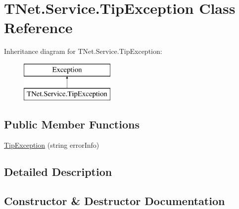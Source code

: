\hypertarget{class_t_net_1_1_service_1_1_tip_exception}{}\section{T\+Net.\+Service.\+Tip\+Exception Class Reference}
\label{class_t_net_1_1_service_1_1_tip_exception}


 


Inheritance diagram for T\+Net.\+Service.\+Tip\+Exception\+:\begin{figure}[H]
\begin{center}
\leavevmode
\includegraphics[height=2.000000cm]{class_t_net_1_1_service_1_1_tip_exception}
\end{center}
\end{figure}
\subsection*{Public Member Functions}
\begin{DoxyCompactItemize}
\item 
\mbox{\hyperlink{class_t_net_1_1_service_1_1_tip_exception_abee4c3dd9b695b317bf66166b92389e2}{Tip\+Exception}} (string error\+Info)
\end{DoxyCompactItemize}


\subsection{Detailed Description}




\subsection{Constructor \& Destructor Documentation}
\mbox{\label{class_t_net_1_1_service_1_1_tip_exception_abee4c3dd9b695b317bf66166b92389e2}} 
